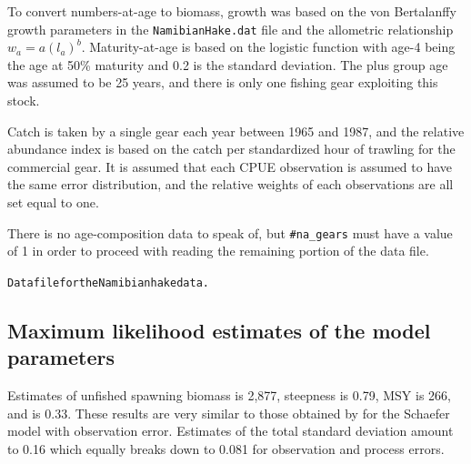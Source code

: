 \begin{multicols}{2}
To convert numbers-at-age to biomass, growth was based on the von Bertalanffy growth parameters in the \verb"NamibianHake.dat" file and the allometric relationship $w_a=a(l_a)^b$. Maturity-at-age is  based on the logistic function with age-4 being the age at 50\% maturity and 0.2 is the standard deviation. The plus group age was assumed to be 25 years, and there is only one fishing gear exploiting this stock.

Catch is taken by a single gear each year between 1965 and 1987, and the relative abundance index is based on the catch per standardized hour of trawling for the commercial gear.  It is assumed that each CPUE observation is assumed to have the same error distribution, and the relative weights of each observations are all set equal to one.

There is no age-composition data to speak of, but \verb"#na_gears" must have a value of 1 in order to proceed with reading the remaining portion of the data file.

\tiny
\noindent \hrulefill
\begin{alltt}
Data file for the Namibian hake data.

\end{alltt}
\hrulefill
\normalsize

\subsection{Maximum likelihood estimates of the model parameters}
Estimates of unfished spawning biomass is 2,877, steepness is 0.79, MSY is 266, and \fmsy is 0.33.  These results are  very similar to those obtained by \cite{hilborn1997ecological} for the Schaefer model with observation error.  Estimates of the total standard deviation amount to 0.16 which equally breaks down to 0.081 for observation and process errors.


\end{multicols}
